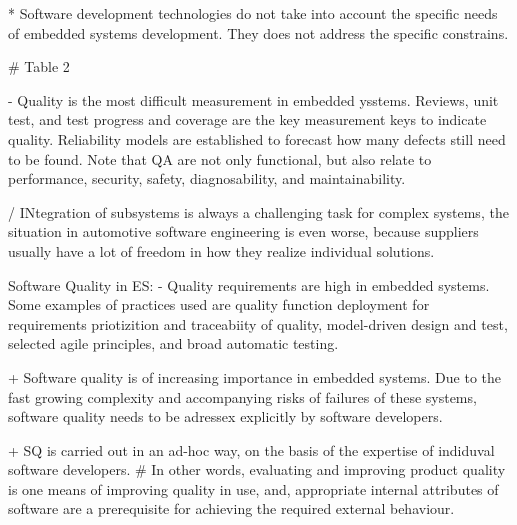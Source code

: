 





* Software development technologies do not take into account the specific needs of embedded systems development. They does not address the specific constrains.

# Table 2


- Quality is the most difficult measurement in embedded ysstems. Reviews, unit test, and test progress and coverage are the key measurement keys to indicate quality. Reliability models are established to forecast how many defects still need to be found. Note that QA are not only functional, but also relate to performance, security, safety, diagnosability, and maintainability.


/ INtegration of subsystems is always a challenging task for complex systems, the situation in automotive software engineering is even worse, because suppliers usually have a lot of freedom in how they realize individual solutions.


Software Quality in ES:
- Quality requirements are high in embedded systems. Some examples of practices used are quality function deployment for requirements priotizition and traceabiity of quality, model-driven design and test, selected agile principles, and broad automatic testing.

+ Software quality is of increasing importance in embedded systems. Due to the fast growing complexity and accompanying risks of failures of these systems, software quality needs to be adressex explicitly by software developers.

+ SQ is carried out in an ad-hoc way, on the basis of the expertise of indiduval software developers.
# In other words, evaluating and improving product quality is one means of improving quality in use, and, appropriate internal attributes of software are a prerequisite for achieving the required external behaviour.

